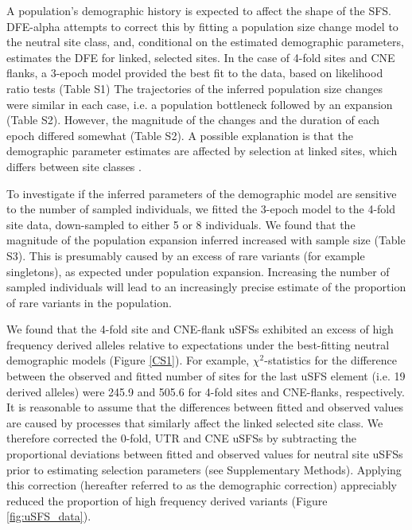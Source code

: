 	A population's demographic history is expected to affect the shape of the SFS. DFE-alpha attempts to correct this by fitting a population size change model to the neutral site class, and, conditional on the estimated demographic parameters, estimates the DFE for linked, selected sites. In the case of 4-fold sites and CNE flanks, a 3-epoch model provided the best fit to the data, based on likelihood ratio tests (Table S1) The trajectories of the inferred population size changes were similar in each case, i.e. a population bottleneck followed by an expansion (Table S2). However, the magnitude of the changes and the duration of each epoch differed somewhat (Table S2). A possible explanation is that the demographic parameter estimates are affected by selection at linked sites, which differs between site classes \citep{RN149, RN241, RN242}. 

	To investigate if the inferred parameters of the demographic model are sensitive to the number of sampled individuals, we fitted the 3-epoch model to the 4-fold site data, down-sampled to either 5 or 8 individuals. We found that the magnitude of the population expansion inferred increased with sample size (Table S3). This is presumably caused by an excess of rare variants (for example singletons), as expected under population expansion. Increasing the number of sampled individuals will lead to an increasingly precise estimate of the proportion of rare variants in the population. 

	We found that the 4-fold site and CNE-flank uSFSs exhibited an excess of high frequency derived alleles relative to expectations under the best-fitting neutral demographic models (Figure \ref{CS1}). For example, $\chi^2$-statistics for the difference between the observed and fitted number of sites for the last uSFS element (i.e. 19 derived alleles) were 245.9 and 505.6 for 4-fold sites and CNE-flanks, respectively. It is reasonable to assume that the differences between fitted and observed values are caused by processes that similarly affect the linked selected site class. We therefore corrected the 0-fold, UTR and CNE uSFSs by subtracting the proportional deviations between fitted and observed values for neutral site uSFSs prior to estimating selection parameters (see Supplementary Methods). Applying this correction (hereafter referred to as the demographic correction) appreciably reduced the proportion of high frequency derived variants (Figure \ref{fig:uSFS_data}).

